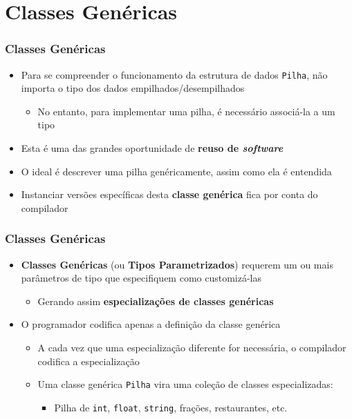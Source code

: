 \documentclass[aspectratio=169]{beamer}
\begin{document}
\section{Classes Genéricas}

\begin{frame}\frametitle{Classes Genéricas}
\begin{itemize}
	\item Para se compreender o funcionamento da estrutura de dados \texttt{Pilha}, não importa o tipo dos dados empilhados/desempilhados
	\begin{itemize}
		\item No entanto, para implementar uma pilha, é necessário associá-la a um tipo
	\end{itemize}
	\item Esta é uma das grandes oportunidade de \textbf{reuso de \emph{software}}
	\item O ideal é descrever uma pilha genéricamente, assim como ela é entendida
	\item Instanciar versões específicas desta \textbf{classe genérica} fica por conta do compilador
\end{itemize}
\end{frame}


\begin{frame}\frametitle{Classes Genéricas}
\begin{itemize}
	\item \textbf{Classes Genéricas} (ou \textbf{Tipos Parametrizados}) requerem um ou mais parâmetros de tipo que especifiquem como customizá-las
	\begin{itemize}
		\item Gerando assim \textbf{especializações de classes genéricas}
	\end{itemize}
	\item O programador codifica apenas a definição da classe genérica
	\begin{itemize}
		\item A cada vez que uma especialização diferente for necessária, o compilador codifica a especialização
		\item Uma classe genérica \texttt{Pilha} vira uma coleção de classes especializadas:
		\begin{itemize}
			\item Pilha de \texttt{int}, \texttt{float}, \texttt{string}, frações, restaurantes, etc.
		\end{itemize}
	\end{itemize}
\end{itemize}
\end{frame}
\end{document}
